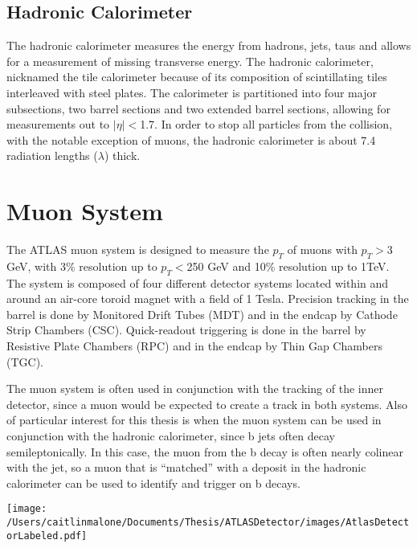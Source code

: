 \subsection{Hadronic Calorimeter} 
The hadronic calorimeter measures the energy from hadrons, jets, taus and allows for a measurement of missing transverse energy.  The hadronic calorimeter, nicknamed the tile calorimeter because of its composition of scintillating tiles interleaved with steel plates.  The calorimeter is partitioned into four major subsections, two barrel sections and two extended barrel sections, allowing for measurements out to $|\eta|<$1.7.  In order to stop all particles from the collision, with the notable exception of muons, the hadronic calorimeter is about 7.4 radiation lengths ($\lambda$) thick.





\section{Muon System}
The ATLAS muon system is designed to measure the $p_T$ of muons with $p_T>$3 GeV, with 3\% resolution up to $p_T<$250 GeV and 10\% resolution up to 1TeV.  The system is composed of four different detector systems located within and around an air-core toroid magnet with a field of 1 Tesla.  Precision tracking in the barrel is done by Monitored Drift Tubes (MDT) and in the endcap by Cathode Strip Chambers (CSC).  Quick-readout triggering is done in the barrel by Resistive Plate Chambers (RPC) and in the endcap by Thin Gap Chambers (TGC).  

The muon system is often used in conjunction with the tracking of the inner detector, since a muon would be expected to create a track in both systems.  Also of particular interest for this thesis is when the muon system can be used in conjunction with the hadronic calorimeter, since b jets often decay semileptonically.  In this case, the muon from the b decay is often nearly colinear with the jet, so a muon that is ``matched'' with a deposit in the hadronic calorimeter can be used to identify and trigger on b decays.  

\texttt{[image: /Users/caitlinmalone/Documents/Thesis/ATLASDetector/images/AtlasDetectorLabeled.pdf]}\label{fig:detector}

